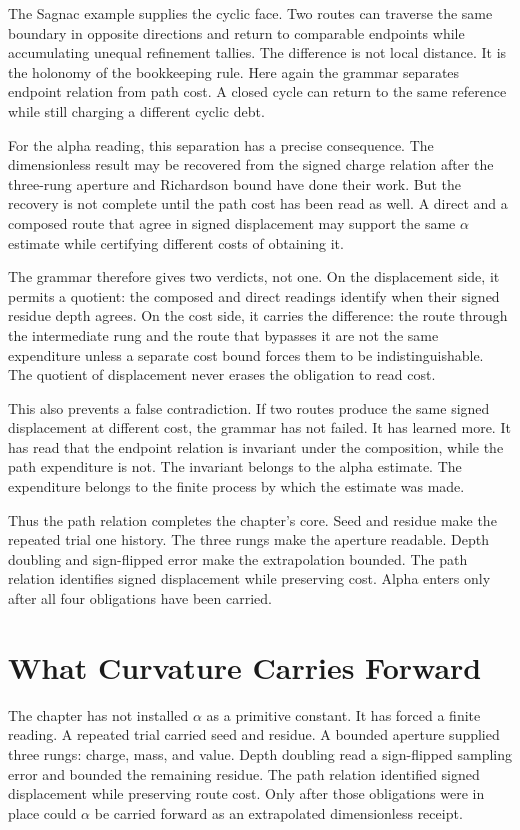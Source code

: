 The Sagnac example supplies the cyclic face. Two routes can traverse the
same boundary in opposite directions and return to comparable endpoints while
accumulating unequal refinement tallies. The difference is not local
distance. It is the holonomy of the bookkeeping rule. Here again the grammar
separates endpoint relation from path cost. A closed cycle can return to the
same reference while still charging a different cyclic debt.

For the alpha reading, this separation has a precise consequence. The
dimensionless result may be recovered from the signed charge relation after
the three-rung aperture and Richardson bound have done their work. But the
recovery is not complete until the path cost has been read as well. A direct
and a composed route that agree in signed displacement may support the same
\(\alpha\) estimate while certifying different costs of obtaining it.

The grammar therefore gives two verdicts, not one. On the displacement side,
it permits a quotient: the composed and direct readings identify when their
signed residue depth agrees. On the cost side, it carries the difference:
the route through the intermediate rung and the route that bypasses it are
not the same expenditure unless a separate cost bound forces them to be
indistinguishable. The quotient of displacement never erases the obligation
to read cost.

This also prevents a false contradiction. If two routes produce the same
signed displacement at different cost, the grammar has not failed. It has
learned more. It has read that the endpoint relation is invariant under the
composition, while the path expenditure is not. The invariant belongs to the
alpha estimate. The expenditure belongs to the finite process by which the
estimate was made.

Thus the path relation completes the chapter's core. Seed and residue make
the repeated trial one history. The three rungs make the aperture readable.
Depth doubling and sign-flipped error make the extrapolation bounded. The
path relation identifies signed displacement while preserving cost. Alpha
enters only after all four obligations have been carried.

\section{What Curvature Carries Forward}

The chapter has not installed \(\alpha\) as a primitive constant. It has
forced a finite reading. A repeated trial carried seed and residue. A bounded
aperture supplied three rungs: charge, mass, and value. Depth doubling read a
sign-flipped sampling error and bounded the remaining residue. The path
relation identified signed displacement while preserving route cost. Only
after those obligations were in place could \(\alpha\) be carried forward as
an extrapolated dimensionless receipt.

